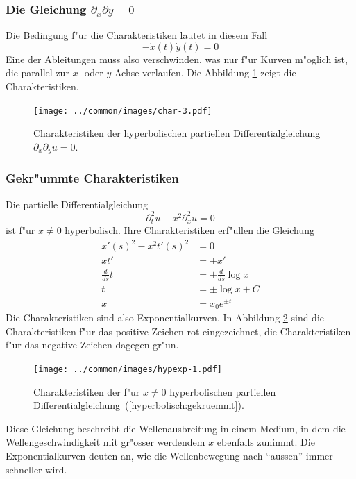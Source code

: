 \subsubsection{Die Gleichung $\partial_x\partial y=0$} Die Bedingung f"ur die
Charakteristiken lautet in diesem Fall
\[
-\dot x(t)\dot y(t)=0
\]
Eine der Ableitungen muss also verschwinden, was nur f"ur Kurven
m"oglich ist, die parallel zur $x$- oder $y$-Achse verlaufen.
Die Abbildung \ref{hyp:dxdy} zeigt die Charakteristiken.
\begin{figure}
\begin{center}
\texttt{[image: ../common/images/char-3.pdf]}
\end{center}
\caption{Charakteristiken der hyperbolischen
partiellen Differentialgleichung
$\partial_x\partial_yu=0$.
\label{hyp:dxdy}}
\end{figure}

\subsubsection{Gekr"ummte Charakteristiken}
Die partielle Differentialgleichung
\begin{equation}
\partial_t^2u-x^2\partial_x^2u=0
\label{hyperbolisch:gekruemmt}
\end{equation}
ist f"ur $x\ne 0$ hyperbolisch.
Ihre Charakteristiken erf"ullen die Gleichung
\begin{align*}
x'(s)^2-x^2t'(s)^2&=0
\\
xt'&=\pm  x'
\\
\frac{d}{ds}t&=\pm\frac{d}{ds}\log x
\\
t&=\pm\log x+C
\\
x&=x_0e^{\pm t}
\end{align*}
Die Charakteristiken sind also Exponentialkurven. In Abbildung \ref{hyp:exp}
sind die Charakteristiken f"ur das positive Zeichen rot eingezeichnet, die
Charakteristiken f"ur das negative Zeichen dagegen gr"un.
\begin{figure}
\begin{center}
\texttt{[image: ../common/images/hypexp-1.pdf]}
\end{center}
\caption{Charakteristiken der f"ur $x\ne 0$ hyperbolischen
partiellen Differentialgleichung~(\ref{hyperbolisch:gekruemmt}).
\label{hyp:exp}}
\end{figure}

Diese Gleichung beschreibt die Wellenausbreitung in einem Medium,
in dem die Wellengeschwindigkeit mit gr"osser werdendem $x$ ebenfalls
zunimmt. Die Exponentialkurven deuten an, wie die Wellenbewegung nach ``aussen''
immer schneller wird.

